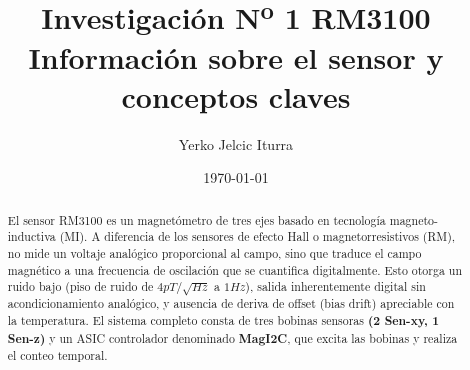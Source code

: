 \documentclass[11pt,letterpaper]{article}
\title{
    Investigación N\textsuperscript{o} 1 RM3100 \\
    \large Información sobre el sensor y conceptos claves
}
\author{Yerko Jelcic Iturra}
\date{\today}
\begin{document}
\maketitle

\begin{abstract}
    El sensor RM3100 es un magnetómetro de tres ejes basado en tecnología magneto-inductiva (MI). A diferencia de los sensores de efecto Hall o magnetorresistivos (RM), no mide un voltaje analógico proporcional al campo, sino que traduce el campo magnético a una frecuencia de oscilación que se cuantifica digitalmente. Esto otorga un ruido bajo (piso de ruido de $4pT/\sqrt{Hz}$ a $1Hz$), salida inherentemente digital sin acondicionamiento analógico, y ausencia de deriva de offset (bias drift) apreciable con la temperatura. El sistema completo consta de tres bobinas sensoras \textbf{(2 Sen-xy, 1 Sen-z)} y un ASIC controlador denominado \textbf{MagI2C}, que excita las bobinas y realiza el conteo temporal.
\end{abstract}
\end{document}
